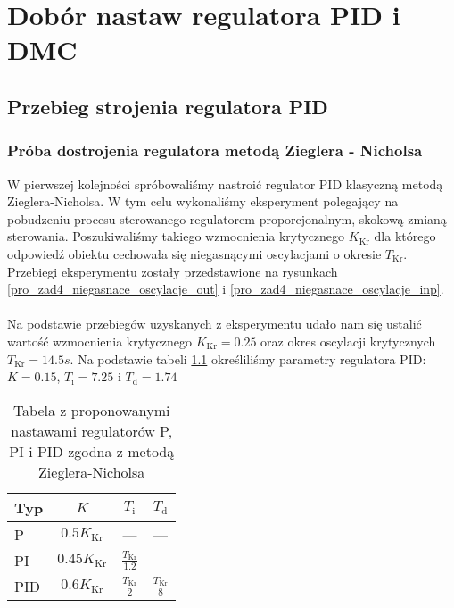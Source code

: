 \chapter{Dobór nastaw regulatora PID i DMC}
\label{pro4}

\section{Przebieg strojenia regulatora PID}
\label{pro4_PID}

\subsection{Próba dostrojenia regulatora metodą Zieglera - Nicholsa}
\label{pro4_PID_ZN}
W pierwszej kolejności spróbowaliśmy nastroić regulator PID klasyczną metodą Zieglera-Nicholsa.
W tym celu wykonaliśmy eksperyment polegający na pobudzeniu procesu sterowanego regulatorem 
proporcjonalnym, skokową zmianą sterowania. Poszukiwaliśmy takiego wzmocnienia krytycznego
$K_{\mathrm{Kr}}$ dla którego odpowiedź obiektu cechowała się niegasnącymi oscylacjami o 
okresie $T_{\mathrm{Kr}}$. Przebiegi eksperymentu zostały przedstawione na rysunkach 
\ref{pro_zad4_niegasnace_oscylacje_out} i \ref{pro_zad4_niegasnace_oscylacje_inp}.\\
\\
\indent Na podstawie przebiegów uzyskanych z eksperymentu udało nam się ustalić wartość wzmocnienia 
krytycznego $K_{\mathrm{Kr}} = \num{0,25}$ oraz okres oscylacji krytycznych $T_{\mathrm{Kr}} =
\num{14.5}s$. Na podstawie tabeli \ref{pro4_tabela_ZN} określiliśmy parametry regulatora PID:
$K = \num{0.15}$, $T_{\mathrm{i}} = \num{7.25}$ i $T_{\mathrm{d}} = \num{1.74}$

\begin{table}[h]
    \centering
    \begin{tabular}{|l|c|c|c|}
    \hline
    Typ & $K$ & $T_{\mathrm{i}}$ & $T_{\mathrm{d}}$ \\ \hline
    P   & $\num{0.5}K_{\mathrm{Kr}}$ & --- & --- \\
    PI  & $\num{0.45}K_{\mathrm{Kr}}$ & $\frac{T_{\mathrm{Kr}}}{\num{1.2}}$ & --- \\
    PID & $\num{0.6}K_{\mathrm{Kr}}$ & $\frac{T_{\mathrm{Kr}}}{\num{2}}$ & $\frac{T_{\mathrm{Kr}}}{\num{8}}$ \\ \hline
    \end{tabular}
    \caption{Tabela z proponowanymi nastawami regulatorów P, PI i PID zgodna z metodą Zieglera-Nicholsa}
    \label{pro4_tabela_ZN}
\end{table}

